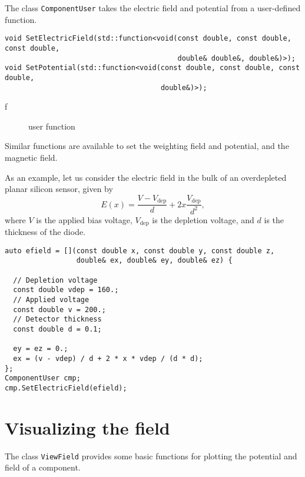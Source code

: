The class \texttt{ComponentUser} takes the electric field and potential
from a user-defined function.
\begin{lstlisting}
void SetElectricField(std::function<void(const double, const double, const double, 
                                         double& double&, double&)>);
void SetPotential(std::function<void(const double, const double, const double, 
                                     double&)>);
\end{lstlisting}
\begin{description}
  \item[f] user function
\end{description}
Similar functions are available to set the weighting field and potential,
and the magnetic field.

As an example, let us consider the electric field in the bulk 
of an overdepleted planar silicon sensor, given by
\begin{equation*}
E\left(x\right) = \frac{V - V_{\text{dep}}}{d} + 
                    2x \frac{V_{\text{dep}}}{d^{2}},
\end{equation*}
where \(V\) is the applied bias voltage, \(V_{\text{dep}}\) is 
the depletion voltage, and \(d\) is the thickness of the diode.
\begin{lstlisting}
auto efield = [](const double x, const double y, const double z,
                 double& ex, double& ey, double& ez) { 

  // Depletion voltage
  const double vdep = 160.;
  // Applied voltage
  const double v = 200.;
  // Detector thickness
  const double d = 0.1;

  ey = ez = 0.;
  ex = (v - vdep) / d + 2 * x * vdep / (d * d);
};
ComponentUser cmp;
cmp.SetElectricField(efield);
\end{lstlisting}

\section{Visualizing the field}

The class \texttt{ViewField} provides some basic functions 
for plotting the potential and field of a component.

